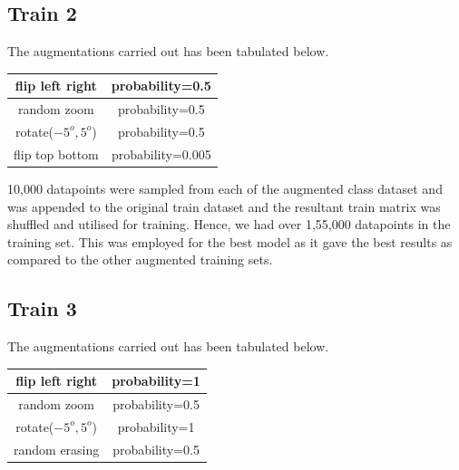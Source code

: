 \documentclass[12pt]{report}
\begin{document}
\subsection{Train 2}
The augmentations carried out has been tabulated below.
\begin{table}[H]
	\label{T:equipos}
	\begin{center}
		\begin{tabular}{| c | c |}
			\hline
			flip left right & probability=0.5 \\
            \hline
            random zoom & probability=0.5 \\
            \hline
            rotate($-5^o,5^o$) & probability=0.5 \\
            \hline
            flip top bottom & probability=0.005 \\
            \hline
		\end{tabular}
	\end{center}
\end{table}
10,000 datapoints were sampled from each of the augmented class dataset and was appended to the original train dataset and the resultant train matrix was shuffled and utilised for training. Hence, we had over 1,55,000 datapoints in the training set. This was employed for the best model as it gave the best results as compared to the other augmented training sets.

\subsection{Train 3}
The augmentations carried out has been tabulated below.
\begin{table}[H]
	\label{T:equipos}
	\begin{center}
		\begin{tabular}{| c | c |}
			\hline
			flip left right & probability=1 \\
            \hline
            random zoom & probability=0.5 \\
            \hline
            rotate($-5^o,5^o$) & probability=1 \\
            \hline
            random erasing & probability=0.5 \\
            \hline
		\end{tabular}
	\end{center}
\end{table}
\end{document}
